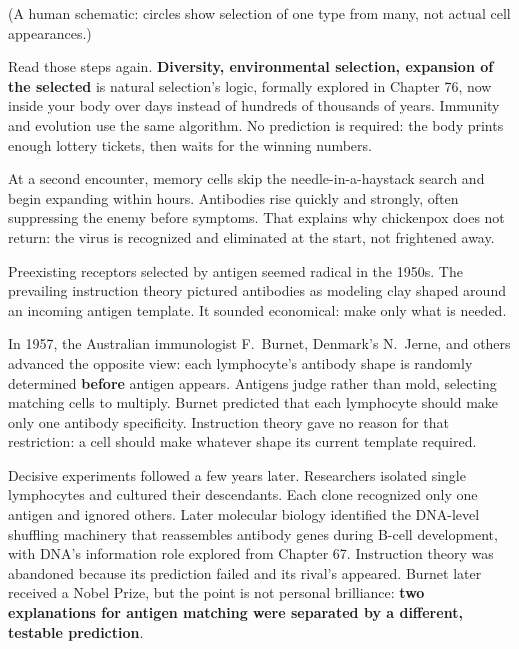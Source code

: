 \begin{center}
\end{center}
\vspace{-1em}
(A human schematic: circles show selection of one type from many, not actual cell appearances.)

Read those steps again. \textbf{Diversity, environmental selection, expansion of the selected} is natural selection's logic, formally explored in Chapter 76, now inside your body over days instead of hundreds of thousands of years. Immunity and evolution use the same algorithm. No prediction is required: the body prints enough lottery tickets, then waits for the winning numbers.

At a second encounter, memory cells skip the needle-in-a-haystack search and begin expanding within hours. Antibodies rise quickly and strongly, often suppressing the enemy before symptoms. That explains why chickenpox does not return: the virus is recognized and eliminated at the start, not frightened away.

\begin{zhengju}
Preexisting receptors selected by antigen seemed radical in the 1950s. The prevailing instruction theory pictured antibodies as modeling clay shaped around an incoming antigen template. It sounded economical: make only what is needed.

In 1957, the Australian immunologist F.~Burnet, Denmark's N.~Jerne, and others advanced the opposite view: each lymphocyte's antibody shape is randomly determined \textbf{before} antigen appears. Antigens judge rather than mold, selecting matching cells to multiply. Burnet predicted that each lymphocyte should make only one antibody specificity. Instruction theory gave no reason for that restriction: a cell should make whatever shape its current template required.

Decisive experiments followed a few years later. Researchers isolated single lymphocytes and cultured their descendants. Each clone recognized only one antigen and ignored others. Later molecular biology identified the DNA-level shuffling machinery that reassembles antibody genes during B-cell development, with DNA's information role explored from Chapter 67. Instruction theory was abandoned because its prediction failed and its rival's appeared. Burnet later received a Nobel Prize, but the point is not personal brilliance: \textbf{two explanations for antigen matching were separated by a different, testable prediction}.
\end{zhengju}

